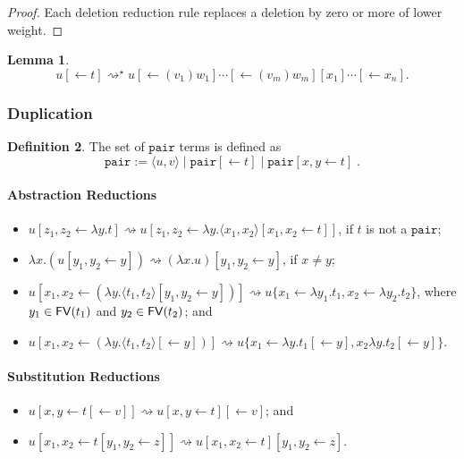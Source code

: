 \documentclass[11pt,a4paper]{article}
\theoremstyle{definition}
\newtheorem{definition}{Definition}
\theoremstyle{plain}
\newtheorem{lemma}[definition]{Lemma}
\theoremstyle{remark}
\begin{document}
\begin{proof}
Each deletion reduction rule replaces a deletion by zero or more of lower weight.
\end{proof}

\begin{lemma}
\[
u[\leftarrow t]\rightsquigarrow^\star u[\leftarrow(v_1)w_1]\cdots[\leftarrow(v_m)w_m][x_1]\cdots[\leftarrow x_n].
\]
\end{lemma}

\subsubsection{Duplication}

\newcommand{\tpair}{{\mathtt{pair}}}

\begin{definition}
	The set of $\tpair$ terms is defined as
	\[\tpair:=\langle u,v\rangle\;|\;\tpair[\leftarrow t]\;|\;\tpair[x,y\leftarrow t]\;.\]
\end{definition}

\paragraph{Abstraction Reductions}

\begin{itemize}
	\item $u[z_1,z_2\leftarrow\lambda y.t]\rightsquigarrow u[z_1,z_2\leftarrow\lambda y.\langle x_1,x_2\rangle[x_1,x_2\leftarrow t]]$, if $t$ is not a $\tpair$;
	\item $\lambda x.(u[y_1,y_2\leftarrow y])\rightsquigarrow (\lambda x.u)[y_1,y_2\leftarrow y]$, if $x\neq y$;
	\item $u[x_1,x_2\leftarrow(\lambda y.\langle t_1,t_2\rangle[y_1,y_2\leftarrow y])]\rightsquigarrow u\{x_1\leftarrow\lambda y_1.t_1,x_2\leftarrow\lambda y_2.t_2\}$, where $y_1\in{\mathop{\mathsf{FV}}}(t_1)$ and $y_2\in{\mathop{\mathsf{FV}}}(t_2)$; and
	\item $u[x_1,x_2\leftarrow(\lambda y.\langle t_1,t_2\rangle[\leftarrow y])]\rightsquigarrow u\{x_1\leftarrow\lambda y.t_1[\leftarrow y],x_2\lambda y.t_2[\leftarrow y]\}$.
\end{itemize}

\paragraph{Substitution Reductions}

\begin{itemize}
	\item $u[x,y\leftarrow t[\leftarrow v]]\rightsquigarrow u[x,y\leftarrow t][\leftarrow v]$; and
	\item $u[x_1,x_2\leftarrow t[y_1,y_2\leftarrow z]]\rightsquigarrow u[x_1,x_2\leftarrow t][y_1,y_2\leftarrow z]$.
\end{itemize}
\end{document}
